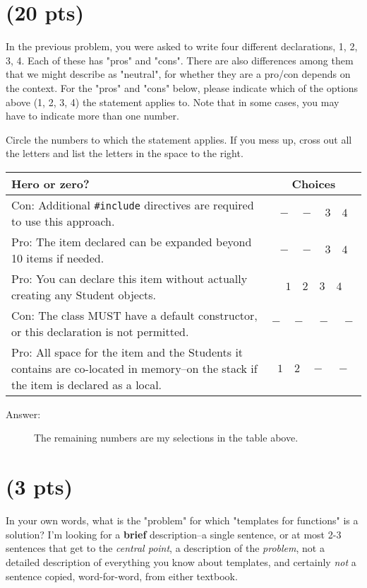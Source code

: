 \documentclass[11pt]{article}
\begin{document}
\section{(20 pts)}
\label{sec:org0e79471}
In the previous problem, you were asked to write four different
declarations, 1, 2, 3, 4.  Each of these has "pros" and "cons".
There are also differences among them that we might describe as
"neutral", for whether they are a pro/con depends on the context.
For the "pros" and "cons" below, please indicate which of the
options above (1, 2, 3, 4) the statement applies to.  Note that in
some cases, you may have to indicate more than one number.

Circle the numbers to which the statement applies.  If you mess up,
cross out all the letters and list the letters in the space to the
right.

\begin{center}
\begin{tabular}{p{14cm}|c}
Hero or zero? & Choices\\
\hline
Con: Additional \texttt{\#include} directives are required to use this approach. & \(- \quad  - \quad 3 \quad 4\)\\
\hline
Pro: The item declared can be expanded beyond 10 items if needed. & \(- \quad - \quad 3 \quad 4\)\\
\hline
Pro: You can declare this item without actually creating any Student objects. & \(1 \quad 2 \quad 3 \quad 4\)\\
\hline
Con: The class MUST have a default constructor, or this declaration is not permitted. & \(- \quad - \quad - \quad -\)\\
\hline
Pro: All space for the item and the Students it contains are co-located in memory--on the stack if the item is declared as a local. & \(1 \quad 2 \quad - \quad -\)\\
\end{tabular}
\end{center}
\begin{description}
  \item[Answer:] The remaining numbers are my selections in the table above.
\end{description}
\newpage

\section{(3 pts)}
\label{sec:org618d2e3}
In your own words, what is the "problem" for which "templates for
functions" is a solution? I'm looking for a \textbf{brief}
description--a single sentence, or at most 2-3 sentences that
get to the \emph{central point}, a description of the \emph{problem}, not a
detailed description of everything you know about templates, and
certainly \emph{not} a sentence copied, word-for-word, from either
textbook.
\end{document}

